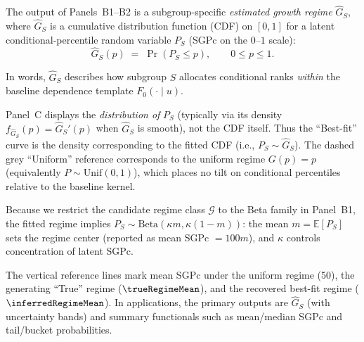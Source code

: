 \documentclass[10pt]{article}
\begin{document}
\noindent
\begin{minipage}[t]{3.75in}
  \vspace{0.05in}
  \hspace{0.15in}%
  \begin{minipage}{3.45in}
    \small\raggedright\color{bodyGrey}

    The output of Panels~B1--B2 is a subgroup-specific \emph{estimated growth regime}
    $\widehat{G}_S$, where $\widehat{G}_S$ is a cumulative distribution function (CDF) on $[0,1]$
    for a latent conditional-percentile random variable $P_S$ (SGPc on the $0$--$1$ scale):
    \[
      \widehat{G}_S(p)\;=\;\Pr(P_S \le p),\qquad 0\le p\le 1.
    \]
    
    \vspace{1pt}
    In words, $\widehat{G}_S$ describes how subgroup $S$ allocates conditional ranks
    \emph{within} the baseline dependence template $F_0(\cdot\mid u)$.
    
    \vspace{4pt}
    Panel~C displays the \emph{distribution of} $P_S$ (typically via its density
    $f_{\widehat{G}_S}(p)=\widehat{G}_S'(p)$ when $\widehat{G}_S$ is smooth), not the CDF itself.
    Thus the ``Best-fit'' curve is the density corresponding to the fitted CDF
    (i.e., $P_S \sim \widehat{G}_S$). The dashed grey ``Uniform'' reference corresponds to the
    uniform regime $G(p)=p$ (equivalently $P\sim\mathrm{Unif}(0,1)$), which places no tilt on
    conditional percentiles relative to the baseline kernel.
    
    \vspace{4pt}
    Because we restrict the candidate regime class $\mathcal{G}$ to the Beta family in Panel~B1,
    the fitted regime implies
    $P_S\sim\mathrm{Beta}(\kappa m,\kappa(1-m))$:
    the mean $m=\mathbb{E}[P_S]$ sets the regime center (reported as mean SGPc $=100m$),
    and $\kappa$ controls concentration of latent SGPc.
    
    \vspace{4pt}
    The vertical reference lines mark mean SGPc under the uniform regime (50),
    the generating ``True'' regime ($\trueRegimeMean$), and the recovered best-fit regime
    ($\inferredRegimeMean$). In applications, the primary outputs are $\widehat{G}_S$
    (with uncertainty bands) and summary functionals such as mean/median SGPc and
    tail/bucket probabilities.

  \end{minipage}
  \vspace{0.1in}
\end{minipage}
\end{document}
